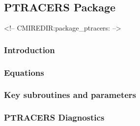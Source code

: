 \subsection {PTRACERS Package} 
\label{sec:pkg:ptracers}
\begin{rawhtml}
<!-- CMIREDIR:package_ptracers: -->
\end{rawhtml}

\subsubsection {Introduction}

\subsubsection {Equations}

\subsubsection {Key subroutines and parameters}

\subsubsection{PTRACERS Diagnostics}
\label{sec:pkg:ptracers:diagnostics}

